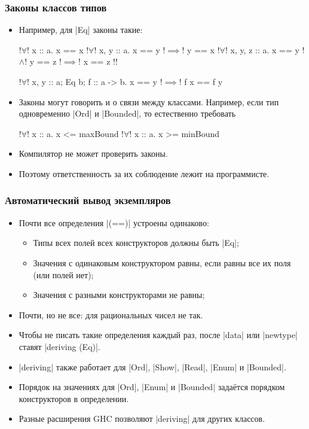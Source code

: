 \documentclass[10pt]{beamer}
\begin{document}
\begin{frame}[fragile]
  \frametitle{Законы классов типов}
  \begin{itemize}
    \item Например, для \haskinline|Eq| законы такие:\pause
          \begin{haskell}
            !$\forall$! x :: a. x == x
            !$\forall$! x, y :: a. x == y !$\implies$! y == x
            !$\forall$! x, y, z :: a. x == y !$\wedge$! y == z !$\implies$! x == z !\pause!

            !$\forall$! x, y :: a; Eq b; f :: a -> b. x == y !$\implies$\pause! 
                f x == f y
          \end{haskell}
          \pause
    \item Законы могут говорить и о связи между классами. Например, если тип одновременно \haskinline|Ord| и \haskinline|Bounded|, то естественно требовать
          \begin{haskell}
            !$\forall$! x :: a. x <= maxBound
            !$\forall$! x :: a. x >= minBound
          \end{haskell}
          \pause
    \item Компилятор не может проверить законы.
    \item Поэтому ответственность за их соблюдение лежит на программисте.
  \end{itemize}
\end{frame}

\begin{frame}[fragile]
  \frametitle{Автоматический вывод экземпляров}
  \begin{itemize}
    \item Почти все определения \haskinline|(==)| устроены одинаково:\pause
          \begin{itemize}
            \item Типы всех полей всех конструкторов должны быть \haskinline|Eq|;
            \item Значения с одинаковым конструктором равны, если равны все их поля (или полей нет);
            \item Значения с разными конструкторами не равны;
          \end{itemize}
    \item Почти, но не все: \pause для рациональных чисел не так.\pause
    \item Чтобы не писать такие определения каждый раз, после \haskinline|data| или \haskinline|newtype| ставят \haskinline|deriving (Eq)|.
    \item \haskinline|deriving| также работает для \haskinline|Ord|, \haskinline|Show|, \haskinline|Read|, \haskinline|Enum| и \haskinline|Bounded|.
    \item Порядок на значениях для \haskinline|Ord|, \haskinline|Enum| и \haskinline|Bounded| задаётся порядком конструкторов в определении.\pause
    \item Разные расширения GHC позволяют \haskinline|deriving| для других классов.
  \end{itemize}
\end{frame}
\end{document}
